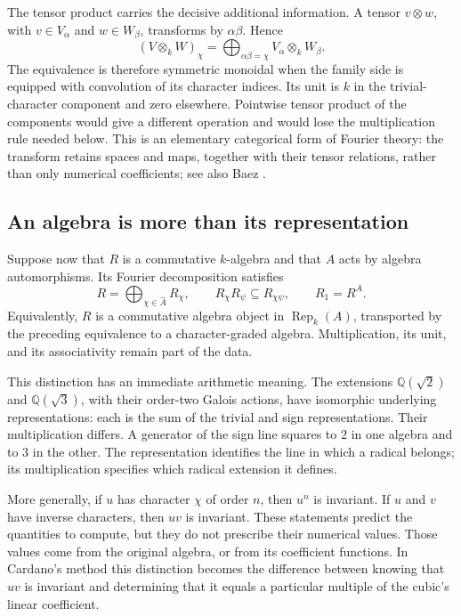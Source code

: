 \documentclass[11pt]{article}
\theoremstyle{remark}
\begin{document}
The tensor product carries the decisive additional information. A tensor \(v\otimes w\), with \(v\in V_\alpha\) and \(w\in W_\beta\), transforms by \(\alpha\beta\). Hence
\[
(V\otimes_k W)_\chi
=\bigoplus_{\alpha\beta=\chi}V_\alpha\otimes_k W_\beta.
\]
The equivalence is therefore symmetric monoidal when the family side is equipped with convolution of its character indices. Its unit is \(k\) in the trivial-character component and zero elsewhere. Pointwise tensor product of the components would give a different operation and would lose the multiplication rule needed below. This is an elementary categorical form of Fourier theory: the transform retains spaces and maps, together with their tensor relations, rather than only numerical coefficients; see also Baez \cite{baez}.

\subsection{An algebra is more than its representation}

Suppose now that \(R\) is a commutative \(k\)-algebra and that \(A\) acts by algebra automorphisms. Its Fourier decomposition satisfies
\[
R=\bigoplus_{\chi\in\widehat A}R_\chi,
\qquad
R_\chi R_\psi\subseteq R_{\chi\psi},
\qquad
R_1=R^A.
\]
Equivalently, \(R\) is a commutative algebra object in \(\operatorname{Rep}_k(A)\), transported by the preceding equivalence to a character-graded algebra. Multiplication, its unit, and its associativity remain part of the data.

This distinction has an immediate arithmetic meaning. The extensions \(\mathbb Q(\sqrt2)\) and \(\mathbb Q(\sqrt3)\), with their order-two Galois actions, have isomorphic underlying representations: each is the sum of the trivial and sign representations. Their multiplication differs. A generator of the sign line squares to \(2\) in one algebra and to \(3\) in the other. The representation identifies the line in which a radical belongs; its multiplication specifies which radical extension it defines.

More generally, if \(u\) has character \(\chi\) of order \(n\), then \(u^n\) is invariant. If \(u\) and \(v\) have inverse characters, then \(uv\) is invariant. These statements predict the quantities to compute, but they do not prescribe their numerical values. Those values come from the original algebra, or from its coefficient functions. In Cardano's method this distinction becomes the difference between knowing that \(uv\) is invariant and determining that it equals a particular multiple of the cubic's linear coefficient.
\end{document}

